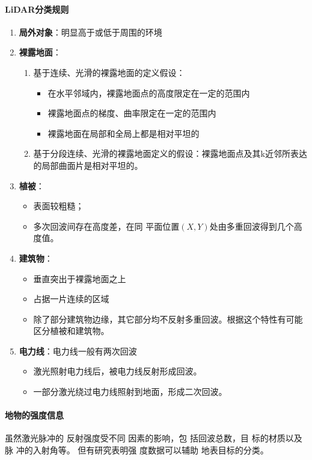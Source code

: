 \paragraph{LiDAR分类规则}
\begin{enumerate}
	\item \textbf{局外对象}：明显高于或低于周围的环境
	\item \textbf{裸露地面}：
		\begin{enumerate}
			\item 基于连续、光滑的裸露地面的定义假设：
				\begin{itemize}
					\item 在水平邻域内，裸露地面点的高度限定在一定的范围内
					\item 裸露地面点的梯度、曲率限定在一定的范围内
					\item 裸露地面在局部和全局上都是相对平坦的
				\end{itemize}
			\item 基于分段连续、光滑的裸露地面定义的假设：裸露地面点及其k近邻所表达的局部曲面片是相对平坦的。
		\end{enumerate}
	\item \textbf{植被}：
		\begin{itemize}
			\item 表面较粗糙；
			\item 多次回波间存在高度差，在同 平面位置$ (X,Y) $处由多重回波得到几个高度值。
		\end{itemize}
	\item \textbf{建筑物}：
		\begin{itemize}
			\item 垂直突出于裸露地面之上
			\item 占据一片连续的区域
			\item 除了部分建筑物边缘，其它部分均不反射多重回波。根据这个特性有可能区分植被和建筑物。
		\end{itemize}
	\item \textbf{电力线}：电力线一般有两次回波
		\begin{itemize}
			\item 激光照射电力线后，被电力线反射形成回波。
			\item 一部分激光绕过电力线照射到地面，形成二次回波。
		\end{itemize}
\end{enumerate}

\paragraph{地物的强度信息}虽然激光脉冲的
反射强度受不同
因素的影响，包
括回波总数，目
标的材质以及脉
冲的入射角等。
但有研究表明强
度数据可以辅助
地表目标的分类。

